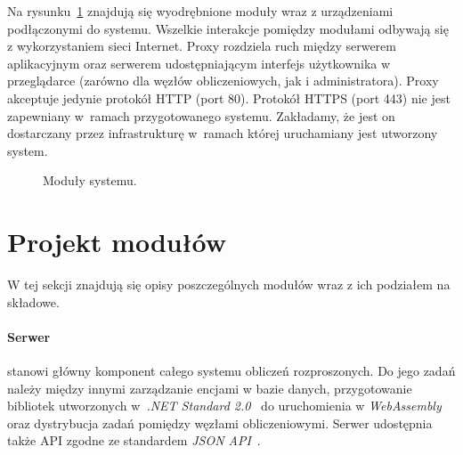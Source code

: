 \documentclass[a4paper,11pt,twoside]{report}
\theoremstyle{definition}
\begin{document}
Na rysunku~\ref{project-model} znajdują się wyodrębnione moduły wraz z urządzeniami podłączonymi do systemu.
Wszelkie interakcje pomiędzy modułami odbywają się z wykorzystaniem sieci Internet.
Proxy rozdziela ruch między serwerem aplikacyjnym oraz serwerem udostępniającym interfejs użytkownika w przeglądarce (zarówno dla węzłów obliczeniowych, jak i administratora).
Proxy akceptuje jedynie protokół HTTP (port 80).
Protokół HTTPS (port 443) nie jest zapewniany w~ramach przygotowanego systemu. Zakładamy, że jest on dostarczany przez infrastrukturę w~ramach której uruchamiany jest utworzony system.


\begin{figure} 
    \caption{Moduły systemu.}
    \label{project-model}
\end{figure}

\section{Projekt modułów}
\label{projekt-modulow}

W tej sekcji znajdują się opisy poszczególnych modułów wraz z ich podziałem na składowe.

\paragraph{Serwer}

stanowi główny komponent całego systemu obliczeń rozproszonych. Do jego zadań należy między innymi zarządzanie encjami w bazie danych, przygotowanie bibliotek utworzonych w~\textit{.NET Standard 2.0}~\cite{dotnet-standard} do uruchomienia w \textit{WebAssembly}~\cite{webassembly} oraz dystrybucja zadań pomiędzy węzłami obliczeniowymi. Serwer udostępnia także API zgodne ze standardem \textit{JSON API}~\cite{jsonapi}.
\end{document}

